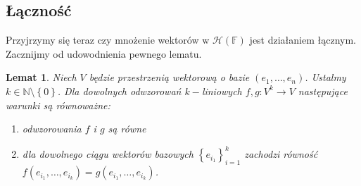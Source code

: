 \documentclass[a4paper,twoside,11pt,reqno]{mwrep}
\theoremstyle{plain} \newtheorem{twr}{Twierdzenie}
\theoremstyle{plain} \newtheorem{lem}{Lemat}
\theoremstyle{definition} \newtheorem{defi}{Definicja}
\theoremstyle{remark} \newtheorem*{wni}{Wniosek}
\theoremstyle{definition} \newtheorem{uwaga}{Uwaga}
\theoremstyle{definition}\newtheorem{prz}{Przykład}
\begin{document}
\subsection{Łączność}
Przyjrzymy się teraz czy mnożenie wektorów w $\mathcal{H}\left(  \mathbb{F}\right)$ jest działaniem łącznym. Zacznijmy od udowodnienia pewnego lematu.
\begin{lem}\label{lemLacznosc}
Niech $V$ będzie przestrzenią wektorową o bazie $(e_1,\dots,e_n)$. Ustalmy $k\in\mathbb{N}\setminus \left\{ 0 \right\}$. Dla dowolnych odwzorowań $k-$liniowych $f,g:V^k 	\rightarrow V$ następujące warunki są równoważne:
\begin{enumerate}
\item odwzorowania $f$ i $g$ są równe
\item dla dowolnego ciągu wektorów bazowych $\left\{ e_{i_1}\right\}_{i=1}^k$ zachodzi równość
$f(e_{i_1},\dots,e_{i_k})=g(e_{i_1},\dots,e_{i_k})$.
\end{enumerate}
\end{lem}
\end{document}
